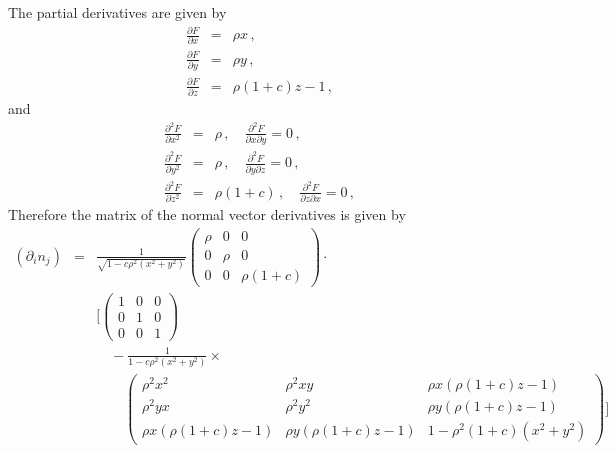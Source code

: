 \documentclass[12pt,a4paper,twoside,openright,BCOR10mm,headsepline,titlepage,abstracton,chapterprefix,final]{scrreprt}
\newcommand\Vector[1]{{\mathbf{#1}}}
\begin{document}
The partial derivatives are given by
\begin{eqnarray}
 \frac{\partial F}{\partial x} &=& \rho x\,,\\
 \frac{\partial F}{\partial y} &=& \rho y\,,\\
 \frac{\partial F}{\partial z} &=& \rho (1+c) z - 1\,,
\end{eqnarray}
and
\begin{eqnarray}
 \frac{\partial^2 F}{\partial x^2} &=& \rho\,, \quad\frac{\partial^2 F}{\partial x \partial y} = 0\,,\\
 \frac{\partial^2 F}{\partial y^2} &=& \rho\,, \quad\frac{\partial^2 F}{\partial y \partial z} = 0\,,\\
 \frac{\partial^2 F}{\partial z^2} &=& \rho (1+c)\,, \quad\frac{\partial^2 F}{\partial z \partial x} = 0\,,
\end{eqnarray}
Therefore the matrix of the normal vector derivatives is given by
\begin{eqnarray}
 (\partial_i n_j) &=& \frac{1}{\sqrt{ 1 - c \rho^2 (x^2 + y^2)}}
\begin{pmatrix}
  \rho & 0 & 0 \\
  0 & \rho & 0 \\
  0 & 0 & \rho(1+c)
\end{pmatrix}\cdot\nonumber\\
&&
\biggl[
\begin{pmatrix}
 1 & 0 & 0 \\
 0 & 1 & 0 \\
 0 & 0 & 1
\end{pmatrix}\nonumber\\
&&\quad
- \frac{1}{1 - c \rho^2 (x^2 + y^2)}\times\nonumber\\
&&\quad\quad
\begin{pmatrix}
 \rho^2 x^2 & \rho^2 x y & \rho x (\rho (1+c) z - 1) \\
 \rho^2 y x & \rho^2 y^2 & \rho y (\rho (1+c) z - 1) \\
 \rho x (\rho (1+c) z - 1) & \rho y (\rho (1+c) z - 1) & 1-\rho^2 (1+c) (x^2+y^2)%
\end{pmatrix}
\biggr]
\end{eqnarray}


\end{document}
